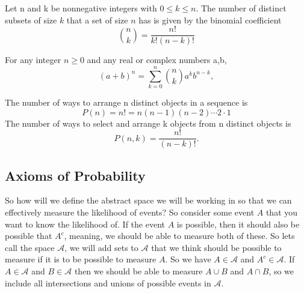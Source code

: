 \documentclass[../main.tex]{subfiles}
\begin{document}
\begin{theorem} \label{thm:binomial coefficient}
Let n and k be nonnegative integers with \( 0 \leq k \leq n\). The number of distinct subsets of size \(k\) that a set of size \(n\) has is given by the binomial coefficient
\[
\binom{n}{k} = \frac{n!}{k!(n-k)!}
\]

\end{theorem}

\begin{theorem} \label{thm:binomial theorem}
For any integer \(n \geq 0\) and any real or complex numbers a,b, 
\[
(a+b)^n = \sum^n_{k=0}{\binom{n}{k} a^{k}b^{n-k}},
\]


\end{theorem}


\begin{theorem} \label{thm:permutations}
The number of ways to arrange n distinct objects in a sequence is 
\[
P(n) = n! = n(n-1)(n-2) \cdots 2 \cdot 1
\]
The number of ways to select and arrange k objects from n distinct objects is
\[
P(n,k) = \frac{n!}{(n-k)!}.
\]
\end{theorem}


\subsection{Axioms of Probability}

\begin{remark}
So how will we define the abstract space we will be working in so that we can effectively measure the likelihood of events? So consider some event $A$ that you want to know the likelihood of. If the event $A$ is possible, then it should also be possible that $A^c$, meaning, we should be able to measure both of these. So lets call the space $\mathcal{A}$, we will add sets to $\mathcal{A}$ that we think should be possible to measure if it is to be possible to measure $A$. So we have $A \in \mathcal{A}$ and $ A^c \in \mathcal{A} $. If $A \in \mathcal{A}$ and $ B \in \mathcal{A} $ then we should be able to measure $ A \cup B $ and $ A \cap B $, so we include all intersections and unions of possible events in $\mathcal{A}$.
\end{remark}
\end{document}
